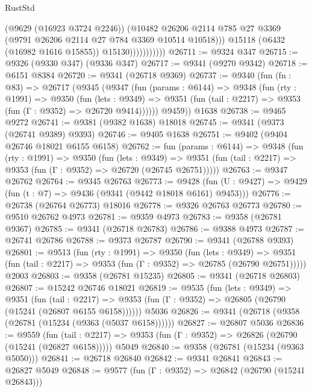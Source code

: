 \begin{lexlean}{RustStd}
\begin{coremodule}
                            (@9629 (@16923 @3724 @2246))
                            (@10482
                              @26206
                              @2114
                              @785
                              @27
                              @3369
                              (@9791 @26206 @2114 @27 @784 @3369 @10514 @10518)))
                          @15118
                          (@6432 (@16982 @1616 @15855))
                          @15130)))))))))))
@26711 := @9324 @347
@26715 := @9326 (@9330 @347) (@9336 @347)
@26717 := @9341 (@9270 @9342)
@26718 := @6151 @8384
@26720 := @9341 (@26718 @9369)
@26737 := @9340
    (fun (fn : @83) =>
    @26717
      (@9345
        (@9347
          (fun (params : @6144) =>
          @9348
            (fun (rty : @1991) =>
            @9350
              (fun (lets : @9349) =>
              @9351 (fun (tail : @2217) => @9353 (fun (Γ : @9352) => @26720 @9414))))))
        @9459))
    @1638
@26738 := @9465 @9272
@26741 := @9381 (@9382 @1638) @18018
@26745 := @9341 (@9373 (@26741 @9389) @9393)
@26746 := @9405 @1638
@26751 := @9402 (@9404 @26746 @18021 @6155 @6158)
@26762 := fun (params : @6144) =>
  @9348
    (fun (rty : @1991) =>
    @9350
      (fun (lets : @9349) =>
      @9351 (fun (tail : @2217) => @9353 (fun (Γ : @9352) => @26720 (@26745 @26751)))))
@26763 := @9347 @26762
@26764 := @9345 @26763
@26773 := @9428
    (fun (U : @9427) => @9429 (fun (t : @7) => @9436 (@9341 (@9442 @18018 @6161) @9453)))
@26776 := @26738 (@26764 @26773) @18016
@26778 := @9326 @26763 @26773
@26780 := @9510 @26762 @4973
@26781 := @9359 @4973
@26783 := @9358 (@26781 @9367)
@26785 := @9341 (@26718 @26783)
@26786 := @9388 @4973
@26787 := @26741 @26786
@26788 := @9373 @26787
@26790 := @9341 (@26788 @9393)
@26801 := @9513
    (fun (rty : @1991) =>
    @9350
      (fun (lets : @9349) =>
      @9351 (fun (tail : @2217) => @9353 (fun (Γ : @9352) => @26785 (@26790 @26751)))))
    @2003
@26803 := @9358 (@26781 @15235)
@26805 := @9341 (@26718 @26803)
@26807 := @15242 @26746 @18021
@26819 := @9535
    (fun (lets : @9349) =>
    @9351
      (fun (tail : @2217) =>
      @9353 (fun (Γ : @9352) => @26805 (@26790 (@15241 (@26807 @6155 @6158))))))
    @5036
@26826 := @9341 (@26718 (@9358 (@26781 (@15234 (@9363 (@5037 @6158))))))
@26827 := @26807 @5036
@26836 := @9559
    (fun (tail : @2217) => @9353 (fun (Γ : @9352) => @26826 (@26790 (@15241 (@26827 @6158)))))
    @5049
@26840 := @9358 (@26781 (@15234 (@9363 @5050)))
@26841 := @26718 @26840
@26842 := @9341 @26841
@26843 := @26827 @5049
@26848 := @9577 (fun (Γ : @9352) => @26842 (@26790 (@15241 @26843)))

\end{coremodule}
\end{lexlean}
